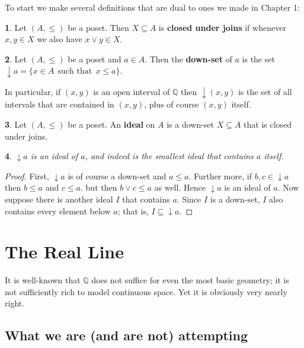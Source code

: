 \documentclass[oneside,english]{amsbook}
\numberwithin{section}{chapter}
\theoremstyle{plain}
\newtheorem{thm}{\protect\theoremname}
\theoremstyle{definition}
\newtheorem{defn}[thm]{\protect\definitionname}
\providecommand{\definitionname}{Definition}
\providecommand{\theoremname}{Theorem}
\begin{document}
To start we make several definitions that are dual to ones we made in Chapter 1:

\begin{defn}
	Let $(A, \le)$ be a poset. Then $X\subseteq A$ is \textbf{closed under joins} if whenever $x,y\in X$ we also have $x\lor y\in X$.
\end{defn}

\begin{defn}
	Let $(A, \le)$ be a poset and $a\in A$. Then the \textbf{down-set} of $a$ is the set $\downarrow a = \{x\in A\ \ \text{such that}\ \ x\le a\}$.
\end{defn}

In particular, if $(x, y)$ is an open interval of $\mathbb{Q}$ then $\downarrow(x, y)$ is the set of all intervals that are contained in $(x, y)$, plus of course $(x, y)$ itself.

\begin{defn}
	Let $(A, \le)$ be a poset. An \textbf{ideal} on $A$ is a down-set $X\subseteq A$ that is closed under joins.
\end{defn}

\begin{thm}
	$\downarrow a$ is an ideal of $a$, and indeed is the smallest ideal that contains $a$ itself. 
\end{thm}

\begin{proof}
	First, $\downarrow a$ is of course a down-set and $a\le a$. Further more, if $b, c\in \downarrow a$ then $b\le a$ and $c\le a$. but then $b\lor c\le a$ as well. Hence  $\downarrow a$ is an ideal of $a$. Now suppose there is another ideal $I$ that contains $a$. Since $I$ is a down-set, $I$ also contains every element below $a$; that is, $I\subseteq \downarrow a$.
\end{proof}


\section{The Real Line}

It is well-known that $\mathbb{Q}$ does not suffice for even the most basic geometry; it is not sufficiently rich to model continuous space. Yet it is obviously very nearly right. 

\subsection{What we are (and are not) attempting}
\end{document}
